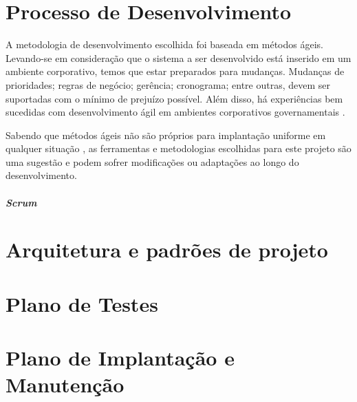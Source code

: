 \documentclass[12pt,a4paper]{report}
\begin{document}
\chapter{Processo de Desenvolvimento}

A metodologia de desenvolvimento escolhida foi baseada em métodos ágeis. Levando-se em consideração que o sistema a ser desenvolvido está inserido em um ambiente corporativo, temos que estar preparados para mudanças. Mudanças de prioridades; regras de negócio; gerência; cronograma; entre outras, devem ser suportadas com o mínimo de prejuízo possível. Além disso, há experiências bem sucedidas com desenvolvimento ágil em ambientes corporativos governamentais \cite{metaginstpub}.

Sabendo que métodos ágeis não são próprios para implantação uniforme em qualquer situação \cite{cohn2009succeeding}, as ferramentas e metodologias escolhidas para este projeto são uma sugestão e podem sofrer modificações ou adaptações ao longo do desenvolvimento.

\paragraph{Scrum} 

\chapter{Arquitetura e padrões de projeto}


\chapter{Plano de Testes}

\chapter{Plano de Implantação e Manutenção}
\end{document}
